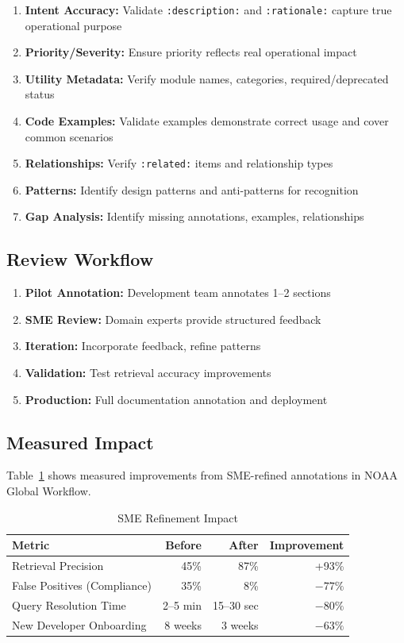 \documentclass[11pt,letterpaper]{article}
\begin{document}
\begin{enumerate}
    \item \textbf{Intent Accuracy:} Validate \texttt{:description:} and \texttt{:rationale:} capture true operational purpose
    \item \textbf{Priority/Severity:} Ensure priority reflects real operational impact
    \item \textbf{Utility Metadata:} Verify module names, categories, required/deprecated status
    \item \textbf{Code Examples:} Validate examples demonstrate correct usage and cover common scenarios
    \item \textbf{Relationships:} Verify \texttt{:related:} items and relationship types
    \item \textbf{Patterns:} Identify design patterns and anti-patterns for recognition
    \item \textbf{Gap Analysis:} Identify missing annotations, examples, relationships
\end{enumerate}

\subsection{Review Workflow}

\begin{enumerate}
    \item \textbf{Pilot Annotation:} Development team annotates 1--2 sections
    \item \textbf{SME Review:} Domain experts provide structured feedback
    \item \textbf{Iteration:} Incorporate feedback, refine patterns
    \item \textbf{Validation:} Test retrieval accuracy improvements
    \item \textbf{Production:} Full documentation annotation and deployment
\end{enumerate}

\subsection{Measured Impact}

Table~\ref{tab:sme-impact} shows measured improvements from SME-refined annotations in NOAA Global Workflow.

\begin{table}[h]
\centering
\caption{SME Refinement Impact}
\label{tab:sme-impact}
\begin{tabular}{@{}lrrr@{}}
\toprule
\textbf{Metric} & \textbf{Before} & \textbf{After} & \textbf{Improvement} \\
\midrule
Retrieval Precision & 45\% & 87\% & +93\% \\
False Positives (Compliance) & 35\% & 8\% & $-77\%$ \\
Query Resolution Time & 2--5 min & 15--30 sec & $-80\%$ \\
New Developer Onboarding & 8 weeks & 3 weeks & $-63\%$ \\
\bottomrule
\end{tabular}
\end{table}
\end{document}
